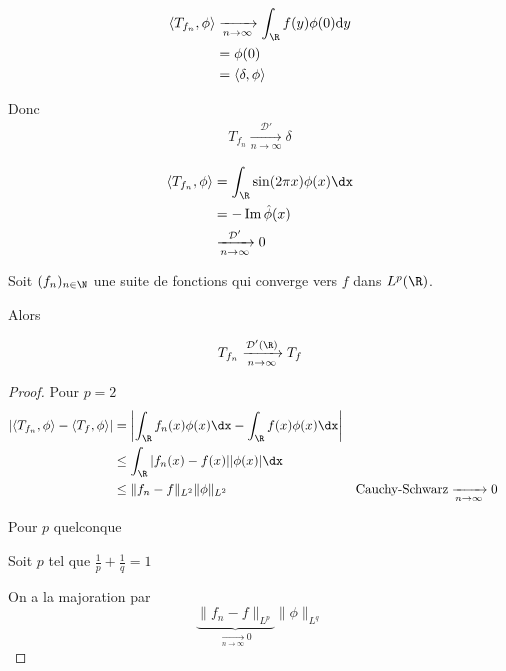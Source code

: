 \begin{description}
			\begin{align*}
				\left<T_{f_n}, \phi\right> &\xrightarrow[n\to \infty]{} \int_\R f(y) \phi(0) \mathrm{d}y \\
				&= \phi(0) \\
				&= \left<\delta, \phi \right> \\
			\end{align*}

			Donc \begin{align*}
				T_{f_n} \xrightarrow[n\to \infty]{\mathcal{D}'} \delta
			\end{align*}

		\item[] 
			\begin{align*}
				\left<T_{f_n}, \phi \right> &= \int_\R \sin(2 \pi x) \phi(x) \dx \\
							    &= -\operatorname{Im} \hat{\phi} (x) \\
							    &\xrightarrow[n\to \infty]{\mathcal{D}'} 0
			\end{align*}

			\begin{theorem}
				Soit $(f_n)_{n\in \N}$ une suite de fonctions qui converge vers $f$ dans $L^p(\R)$.

				Alors 

				\[
					T_{f_n} \xrightarrow[n\to \infty]{\mathcal{D}'(\R)} T_f
				\] 
				
			\end{theorem}

			\begin{proof}
				Pour $p=2$
				\begin{align*}
					\left| \left<T_{f_n}, \phi \right> - \left<T_f, \phi \right>\right| &= \left| \int_{\R} f_n(x) \phi(x) \dx - \int_\R f(x) \phi(x) \dx \right| \\
													    &\le \int_\R |f_n(x) - f(x)| |\phi(x)| \dx \\
													    &\le \|f_n - f\|_{L^2} \|\phi\|_{L^2} \quad&\text{Cauchy-Schwarz}
													    &\xrightarrow[n\to \infty]{} 0
				\end{align*}

				Pour $p$ quelconque

				Soit $p$ tel que $\frac{1}{p} + \frac{1}{q} = 1$

				On a la majoration par  \[
					\underbrace{\|f_n - f\|_{L^p}}_{\xrightarrow[n\to \infty]{} 0} \|\phi\|_{L^q}
				\] 

			\end{proof}


\end{description}
